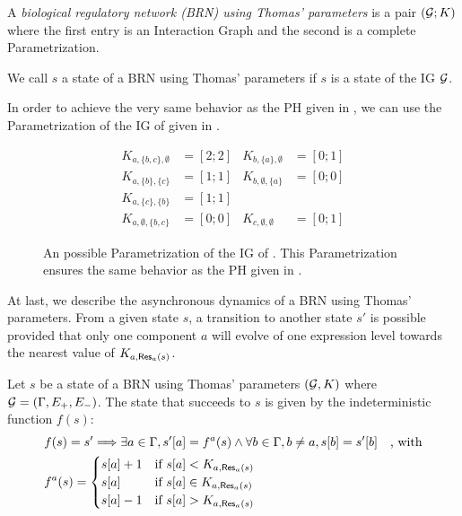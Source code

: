\begin{definition}\label{def:brn}
A \emph{biological regulatory network (BRN) using Thomas' parameters} is a pair $(\mathcal{G}; K)$ where the first entry is an Interaction Graph and the second is a complete Parametrization.
\end{definition}
We call $s$ a state of a BRN using Thomas' parameters if $s$ is a state of the IG $\mathcal{G}$.

\begin{example*}
In order to achieve the very same behavior as the PH given in , we can use the Parametrization of the IG of  given in .

\begin{figure}[t]
\begin{align*}
K_{a,\{b,c\},\emptyset} &= [2 ; 2] & K_{b,\{a\},\emptyset} &= [0 ; 1] \\
K_{a,\{b\},\{c\}} &= [1 ; 1] & K_{b,\emptyset,\{a\}} &= [0 ; 0] \\
K_{a,\{c\},\{b\}} &= [1 ; 1] &&\\
K_{a,\emptyset,\{b,c\}} &= [0 ; 0] & K_{c,\emptyset,\emptyset} &= [0 ; 1]
\end{align*}
\caption{\label{fig:runningBRN-param}
An possible Parametrization of the IG of .
This Parametrization ensures the same behavior as the PH given in .
}
\end{figure}
\end{example*}

At last, we describe the asynchronous dynamics of a BRN using Thomas' parameters.
From a given state $s$, a transition to another state $s'$ is possible provided that only one component $a$ will evolve of one expression level towards the nearest value of $K_{a,\mathsf{Res}_{a}(s)}$.

\begin{definition}\label{def:dynamics}
Let $s$ be a state of a BRN using Thomas' parameters $(\mathcal{G}, K)$ where $\mathcal{G} = (\Gamma, E_+, E_-)$.
The state that succeeds to $s$ is given by the indeterministic function $f(s)$:
\begin{align*}
  & f(s) = s' \Longrightarrow \exists a \in \Gamma,
    {s'[a]} = f^a(s) \wedge
    \forall b \in \Gamma, b \neq a, {s[b]} = {s'[b]}
    \quad\text{, with}\\
  & f^a(s) =
  \begin{cases}
    {s[a]} + 1 & \text{if } {s[a]} < K_{a, \mathsf{Res}_{a}(s)} \\
    {s[a]} & \text{if } {s[a]} \in K_{a,\mathsf{Res}_{a}(s)}\\
    {s[a]} - 1 & \text{if } {s[a]} > K_{a,\mathsf{Res}_{a}(s)}
  \end{cases}
\end{align*}
\end{definition}


